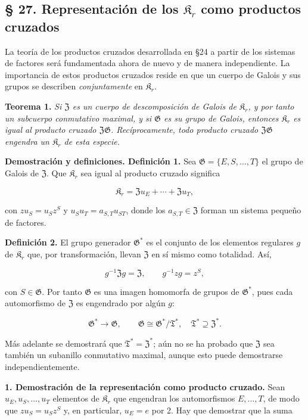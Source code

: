\subsection*{§ 27. Representación de los $\mathfrak K_r$ como productos cruzados}

La teoría de los productos cruzados desarrollada en §24 a partir de los sistemas de factores será fundamentada ahora de nuevo y de manera independiente. La importancia de estos productos cruzados reside en que un cuerpo de Galois y sus grupos se describen \emph{conjuntamente} en $\mathfrak K_r$.

\noindent\textbf{Teorema 1.} \emph{Si $\mathfrak Z$ es un cuerpo de descomposición de Galois de $\mathfrak K_r$, y por tanto un subcuerpo conmutativo maximal, y si $\mathfrak G$ es su grupo de Galois, entonces $\mathfrak K_r$ es igual al producto cruzado $\mathfrak Z\mathfrak G$. Recíprocamente, todo producto cruzado $\mathfrak Z\mathfrak G$ engendra un $\mathfrak K_r$ de esta especie.}

\noindent\textbf{Demostración y definiciones. Definición 1.} Sea $\mathfrak G=\{E,S,\ldots,T\}$ el grupo de Galois de $\mathfrak Z$. Que $\mathfrak K_r$ sea igual al producto cruzado significa

\[
\mathfrak K_r=\mathfrak Zu_E+\cdots+\mathfrak Zu_T,
\]

con $zu_S=u_Sz^S$ y $u_Su_T=a_{S,T}u_{ST}$, donde los $a_{S,T}\in\mathfrak Z$ forman un sistema pequeño de factores.

\noindent\textbf{Definición 2.} El grupo generador $\mathfrak G^*$ es el conjunto de los elementos regulares $g$ de $\mathfrak K_r$ que, por transformación, llevan $\mathfrak Z$ en sí mismo como totalidad. Así,

\[
g^{-1}\mathfrak Zg=\mathfrak Z,
\qquad g^{-1}zg=z^S,
\]

con $S\in\mathfrak G$. Por tanto $\mathfrak G$ es una imagen homomorfa de grupos de $\mathfrak G^*$, pues cada automorfismo de $\mathfrak Z$ es engendrado por algún $g$:

\[
\mathfrak G^*\longrightarrow\mathfrak G,
\qquad
\mathfrak G\cong\mathfrak G^*/\mathfrak T^*,
\quad \mathfrak T^*\supseteq\mathfrak Z^*.
\]

Más adelante se demostrará que $\mathfrak T^*=\mathfrak Z^*$; aún no se ha probado que $\mathfrak Z$ sea también un subanillo conmutativo maximal, aunque esto puede demostrarse independientemente.

\noindent\textbf{1. Demostración de la representación como producto cruzado.} Sean $u_E,u_S,\ldots,u_T$ elementos de $\mathfrak K_r$ que engendran los automorfismos $E,\ldots,T$, de modo que $zu_S=u_Sz^S$ y, en particular, $u_E=e$ por 2. Hay que demostrar que la suma

